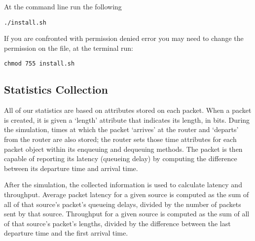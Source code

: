 At the command line run the following

\begin{lstlisting}
./install.sh
\end{lstlisting}

If you are confronted with permission denied error you may need to change the permission on the file, at the terminal run:

\begin{lstlisting}
chmod 755 install.sh
\end{lstlisting}

\subsection{Statistics Collection}

All of our statistics are based on attributes stored on each packet.
When a packet is created, it is given a `length' attribute that indicates its length, in bits.
During the simulation, times at which the packet `arrives' at the router and `departs' from the router are also stored;
the router sets those time attributes for each packet object within its enqueuing and dequeuing methods.
The packet is then capable of reporting its latency (queueing delay) by computing the difference between its departure time and arrival time.

After the simulation, the collected information is used to calculate latency and throughput.
Average packet latency for a given source is computed as the sum of all of that source's packet's queueing delays, divided by the number of packets sent by that source.
Throughput for a given source is computed as the sum of all of that source's packet's lengths, divided by the difference between the last departure time and the first arrival time.
